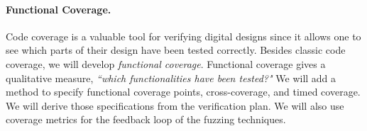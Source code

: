\documentclass[fleqn,12pt]{article}
\begin{document}


\paragraph{Functional Coverage.}

Code coverage is a valuable tool for verifying digital designs
since it allows one to see which parts of their design have been tested correctly.
Besides classic code coverage, we will develop \emph{functional coverage}.
Functional coverage gives a qualitative measure, \textit{``which functionalities have been tested?"}
We will add a method to specify functional coverage points, cross-coverage, and timed
coverage. We will derive those specifications from the verification plan.
We will also use coverage metrics for the feedback loop of the fuzzing techniques.



%
\end{document}
